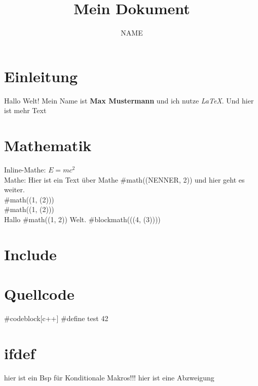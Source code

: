 \documentclass{article}
\title{Mein Dokument}
\author{NAME}
\begin{document}
\maketitle

\section{Einleitung}
Hallo Welt! 
Mein Name ist \textbf{Max Mustermann} und ich nutze \textit{LaTeX}.
Und hier ist mehr Text

\section{Mathematik}
Inline-Mathe: $E = mc^2$  \\
Mathe: Hier ist ein Text über Mathe #math(\frac(NENNER, 2)) und hier geht es weiter.\\  

#math(\frac(1, \sqrt(2))) \\

#math(\pow(1, \sqrt(2))) \\

Hallo #math(\frac(1, 2)) Welt.  
#blockmath(\sqrt(\frac(4, \abs(3))))

\section{Include}


\section{Quellcode}

#codeblock[c++]{
#define test 42
}


\section{ifdef}
hier ist ein Bsp für Konditionale Makros!!!
\else
hier ist eine Abzweigung
\endif
\end{document}
